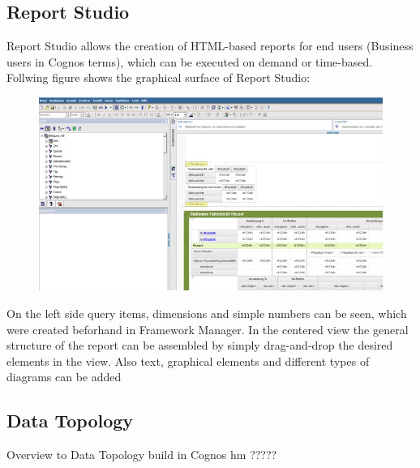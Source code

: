 \documentclass[a4paper]{article}
\begin{document}
	\subsection{Report Studio}
	Report Studio allows the creation of HTML-based reports for end users
	(Business users in Cognos terms), which can be executed on demand or
	time-based.\\
	Follwing figure shows the graphical surface of Report Studio: 
	\begin{figure}[!ht]
		  \centering
		      \includegraphics[width=1.0\textwidth]{ReportStudio_2}
		  \caption{}
	\end{figure}
	On the left side query items, dimensions and simple numbers can be seen, which
	were created beforhand in Framework Manager. In the centered view the general
	structure of the report can be assembled by simply drag-and-drop the desired
	elements in the view. Also text, graphical elements and different types of
	diagrams can be added
	\subsection{Data Topology}
	Overview to Data Topology build in Cognos  hm ?????
	
	\newpage
		
\end{document}
